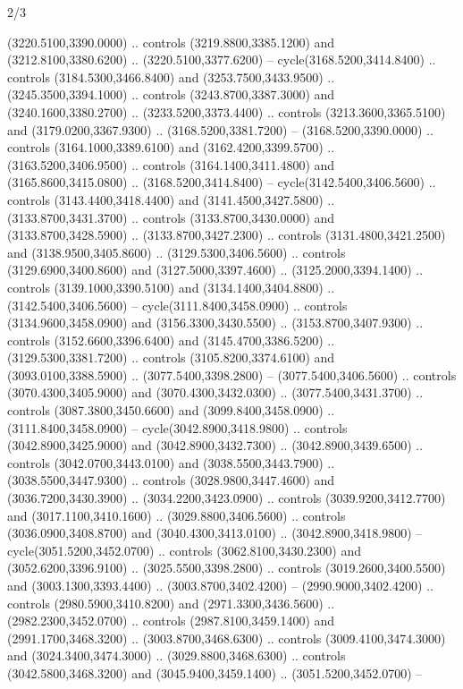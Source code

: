 \begin{flagdescription}{2/3}
\begin{scope}[shift={(0.5\flaglength,0.5)},scale=\flagwidth/130]
\begin{scope}[y=0.01mm, x=0.01mm,shift={(-3365,-2250)}]
  (3220.5100,3390.0000) .. controls (3219.8800,3385.1200) and
  (3212.8100,3380.6200) .. (3220.5100,3377.6200) -- cycle(3168.5200,3414.8400)
  .. controls (3184.5300,3466.8400) and (3253.7500,3433.9500) ..
  (3245.3500,3394.1000) .. controls (3243.8700,3387.3000) and
  (3240.1600,3380.2700) .. (3233.5200,3373.4400) .. controls
  (3213.3600,3365.5100) and (3179.0200,3367.9300) .. (3168.5200,3381.7200) --
  (3168.5200,3390.0000) .. controls (3164.1000,3389.6100) and
  (3162.4200,3399.5700) .. (3163.5200,3406.9500) .. controls
  (3164.1400,3411.4800) and (3165.8600,3415.0800) .. (3168.5200,3414.8400) --
  cycle(3142.5400,3406.5600) .. controls (3143.4400,3418.4400) and
  (3141.4500,3427.5800) .. (3133.8700,3431.3700) .. controls
  (3133.8700,3430.0000) and (3133.8700,3428.5900) .. (3133.8700,3427.2300) ..
  controls (3131.4800,3421.2500) and (3138.9500,3405.8600) ..
  (3129.5300,3406.5600) .. controls (3129.6900,3400.8600) and
  (3127.5000,3397.4600) .. (3125.2000,3394.1400) .. controls
  (3139.1000,3390.5100) and (3134.1400,3404.8800) .. (3142.5400,3406.5600) --
  cycle(3111.8400,3458.0900) .. controls (3134.9600,3458.0900) and
  (3156.3300,3430.5500) .. (3153.8700,3407.9300) .. controls
  (3152.6600,3396.6400) and (3145.4700,3386.5200) .. (3129.5300,3381.7200) ..
  controls (3105.8200,3374.6100) and (3093.0100,3388.5900) ..
  (3077.5400,3398.2800) -- (3077.5400,3406.5600) .. controls
  (3070.4300,3405.9000) and (3070.4300,3432.0300) .. (3077.5400,3431.3700) ..
  controls (3087.3800,3450.6600) and (3099.8400,3458.0900) ..
  (3111.8400,3458.0900) -- cycle(3042.8900,3418.9800) .. controls
  (3042.8900,3425.9000) and (3042.8900,3432.7300) .. (3042.8900,3439.6500) ..
  controls (3042.0700,3443.0100) and (3038.5500,3443.7900) ..
  (3038.5500,3447.9300) .. controls (3028.9800,3447.4600) and
  (3036.7200,3430.3900) .. (3034.2200,3423.0900) .. controls
  (3039.9200,3412.7700) and (3017.1100,3410.1600) .. (3029.8800,3406.5600) ..
  controls (3036.0900,3408.8700) and (3040.4300,3413.0100) ..
  (3042.8900,3418.9800) -- cycle(3051.5200,3452.0700) .. controls
  (3062.8100,3430.2300) and (3052.6200,3396.9100) .. (3025.5500,3398.2800) ..
  controls (3019.2600,3400.5500) and (3003.1300,3393.4400) ..
  (3003.8700,3402.4200) -- (2990.9000,3402.4200) .. controls
  (2980.5900,3410.8200) and (2971.3300,3436.5600) .. (2982.2300,3452.0700) ..
  controls (2987.8100,3459.1400) and (2991.1700,3468.3200) ..
  (3003.8700,3468.6300) .. controls (3009.4100,3474.3000) and
  (3024.3400,3474.3000) .. (3029.8800,3468.6300) .. controls
  (3042.5800,3468.3200) and (3045.9400,3459.1400) .. (3051.5200,3452.0700) --

\end{scope}
\end{scope}
\end{flagdescription}
